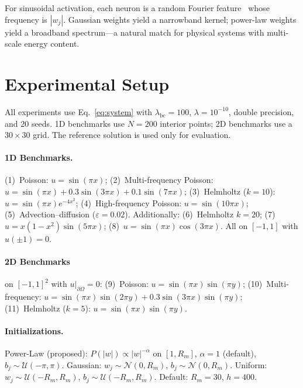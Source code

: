 \documentclass[final,12pt,3p,times,fleqn]{elsarticle}
\begin{document}
For sinusoidal activation, each neuron is a random Fourier feature~\cite{rahimi2007random,tancik2020fourier} whose frequency is $|w_j|$. Gaussian weights yield a narrowband kernel; power-law weights yield a broadband spectrum---a natural match for physical systems with multi-scale energy content.


\section{Experimental Setup}
\label{sec:setup}

All experiments use Eq.~\ref{eq:system} with $\lambda_{\text{bc}} = 100$, $\lambda = 10^{-10}$, double precision, and 20 seeds. 1D benchmarks use $N = 200$ interior points; 2D benchmarks use a $30 \times 30$ grid. The reference solution is used only for evaluation.

\paragraph{1D Benchmarks.}
(1)~Poisson: $u = \sin(\pi x)$;
(2)~Multi-frequency Poisson: $u = \sin(\pi x) + 0.3\sin(3\pi x) + 0.1\sin(7\pi x)$;
(3)~Helmholtz ($k{=}10$): $u = \sin(\pi x)e^{-4x^2}$;
(4)~High-frequency Poisson: $u = \sin(10\pi x)$;
(5)~Advection--diffusion ($\varepsilon{=}0.02$).
Additionally: (6)~Helmholtz $k{=}20$; (7)~$u = x(1{-}x^2)\sin(5\pi x)$; (8)~$u = \sin(\pi x)\cos(3\pi x)$.
All on $[-1,1]$ with $u(\pm 1) = 0$.

\paragraph{2D Benchmarks} on $[-1,1]^2$ with $u|_{\partial\Omega} = 0$:
(9)~Poisson: $u = \sin(\pi x)\sin(\pi y)$;
(10)~Multi-frequency: $u = \sin(\pi x)\sin(2\pi y) + 0.3\sin(3\pi x)\sin(\pi y)$;
(11)~Helmholtz ($k{=}5$): $u = \sin(\pi x)\sin(\pi y)$.

\paragraph{Initializations.}
Power-Law (proposed): $P(|w|) \propto |w|^{-\alpha}$ on $[1, R_m]$, $\alpha = 1$ (default), $b_j \sim \mathcal{U}(-\pi, \pi)$.
Gaussian: $w_j \sim \mathcal{N}(0, R_m)$, $b_j \sim \mathcal{N}(0, R_m)$.
Uniform: $w_j \sim \mathcal{U}(-R_m, R_m)$, $b_j \sim \mathcal{U}(-R_m, R_m)$.
Default: $R_m = 30$, $h = 400$.
\end{document}
